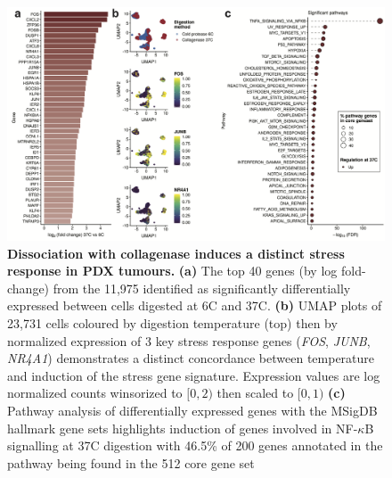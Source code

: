 
\begin{figure}
	\centering
	\includegraphics[width=\textwidth]{Figures/chap3/stressresponse1.png}
	\caption[Dissociation with collagenase induces a distinct stress response in PDX tumours]
	{\small
	    \textbf{Dissociation with collagenase induces a distinct stress response in PDX tumours.}
	    \textbf{(a)} The top 40 genes (by log fold-change) from the 11,975 identified as significantly differentially expressed between cells digested at 6\textdegree C and 37\textdegree C.
	    \textbf{(b)} UMAP plots of 23,731 cells coloured by digestion temperature (top) then by normalized expression of 3 key stress response genes (\textit{FOS}, \textit{JUNB}, \textit{NR4A1}) demonstrates a distinct concordance between temperature and induction of the stress gene signature.
    Expression values are log normalized counts winsorized to $[0,2)$ then scaled to $[0,1)$
	    \textbf{(c)} Pathway analysis of differentially expressed genes with the MSigDB hallmark gene sets highlights induction of genes involved in NF-$\kappa$B signalling at 37\textdegree C digestion with 46.5\% of 200 genes annotated in the pathway being found in the 512 core gene set}
	\label{fig:stressresponseinpdx}
\end{figure}


